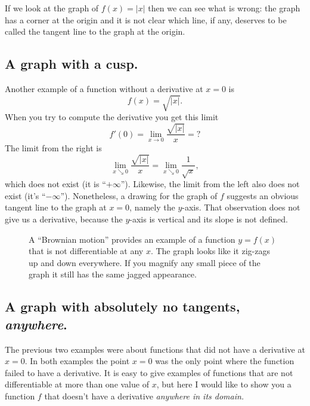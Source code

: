 If we look at the graph of $f(x) = |x|$ then we can see what is wrong:
the graph has a corner at the origin and it is not clear which line,
if any, deserves to be called the tangent line to the graph at the origin.








\subsection{A graph with a cusp. } 
  Another example of a function without a derivative at $x=0$ is
\[
f(x) = \sqrt{|x|}.
\]%
%
When you try to compute the derivative you get this limit
\[
f'(0) = \lim_{x\to0} \frac{\sqrt{|x|}}{x} = \text{?}
\]
The limit from the right is
\[
\lim_{x\searrow 0} \frac{\sqrt{|x|}}{x}
= \lim_{x\searrow 0} \frac1{\sqrt x},
\]
which does not exist (it is ``$+\infty$'').  Likewise, the limit from
the left also does not exist (it's ``$-\infty$'').  Nonetheless, a
drawing for the graph of $f$ suggests an obvious tangent line to the graph
at $x=0$, namely the $y$-axis.  That observation does not give us a
derivative, because the $y$-axis is vertical and its slope is not defined.

\begin{figure}
  
  \caption{A ``Brownian motion'' provides an example of a function
    $y=f(x)$ that is not differentiable at any $x$.  The graph
    looks like it zig-zags up and down everywhere.  If you magnify any
    small piece of the graph it still has the same jagged appearance. }
\end{figure}

\subsection{A graph with absolutely no tangents, \emph{anywhere}. } 
The previous two examples were about functions that did not have a
derivative at $x=0$.  In both examples the point $x=0$ was the only point
where the function failed to have a derivative.  It is easy to give
examples of functions that are not differentiable at more than one value of
$x$, but here I would like to show you a function $f$ that doesn't have a
derivative \emph{anywhere in its domain.  }

